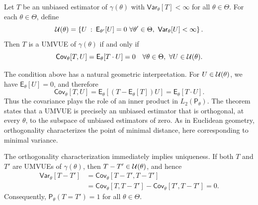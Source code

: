 \begin{theo}
\label{theo:l2}
Let \(T\) be an unbiased estimator of \(\gamma(\theta)\) with
\(\mathsf{Var}_{\theta}[T] < \infty\) for all \(\theta \in \Theta\).
For each \(\theta \in \Theta\), define
\[
    \mathcal{U}(\theta)
    =
    \left\{
        U \::\:
        \mathsf{E}_{\theta'}[U] = 0 \ \forall \theta' \in \Theta,
        \ \mathsf{Var}_{\theta}[U] < \infty
    \right\}.
\]
Then \(T\) is a UMVUE of \(\gamma(\theta)\) if and only if
\[
    \mathsf{Cov}_{\theta}[T,U]
    =
    \mathsf{E}_{\theta}[T \cdot U]
    =
    0
    \quad
    \forall \theta \in \Theta,
    \ \forall U \in \mathcal{U}(\theta).
\]
\end{theo}

\medskip

The condition above has a natural geometric interpretation.
For \(U \in \mathcal{U}(\theta)\), we have \(\mathsf{E}_{\theta}[U]=0\), and therefore
\[
    \mathsf{Cov}_{\theta}[T,U]
    =
    \mathsf{E}_{\theta}\!\left[(T-\mathsf{E}_{\theta}[T])U\right]
    =
    \mathsf{E}_{\theta}[T \cdot U].
\]
Thus the covariance plays the role of an inner product in \(L_{2}(\mathsf{P}_{\theta})\).
The theorem states that a UMVUE is precisely an unbiased estimator that is orthogonal,
at every \(\theta\), to the subspace of unbiased estimators of zero.
As in Euclidean geometry, orthogonality characterizes the point of minimal distance,
here corresponding to minimal variance.

\begin{remark}
The orthogonality characterization immediately implies uniqueness.
If both \(T\) and \(T'\) are UMVUEs of \(\gamma(\theta)\), then
\(T-T' \in \mathcal{U}(\theta)\), and hence
\begin{align*}
    \mathsf{Var}_{\theta}[T-T']
    &=
    \mathsf{Cov}_{\theta}[T-T',T-T']  \\
    &=
    \mathsf{Cov}_{\theta}[T,T-T']
    -
    \mathsf{Cov}_{\theta}[T',T-T']
    =
    0.
\end{align*}
Consequently, \(\mathsf{P}_{\theta}(T=T')=1\) for all \(\theta\in\Theta\).
\end{remark}

